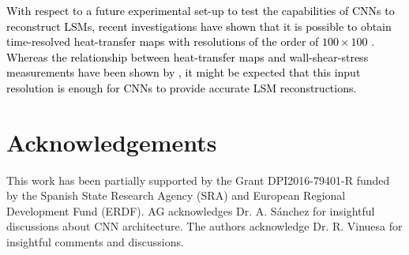 \textcolor{black}{With respect to a future experimental set-up to test the capabilities of CNNs to reconstruct LSMs, recent investigations have shown that it is possible to obtain time-resolved heat-transfer maps with resolutions of the order of $100\times100$ \citep{nakamura2013quantitative,raiola2017towards,mallor2019modal}.
Whereas the relationship between heat-transfer maps and wall-shear-stress measurements have been shown by \citet{mayer1998quantitative}, it might be expected that this input resolution is enough for CNNs to provide accurate LSM reconstructions.}

\section*{Acknowledgements}
This work has been partially supported by the Grant DPI2016-79401-R funded by the Spanish State Research Agency (SRA) and European Regional Development Fund (ERDF).
 AG acknowledges Dr. A. S\'anchez for insightful discussions about CNN architecture.
 The authors acknowledge Dr. R. Vinuesa for insightful comments and discussions.

%

%
